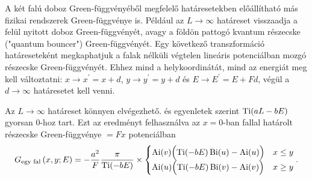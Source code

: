 A két falú doboz Green-függvényéből megfelelő határesetekben előállítható más fizikai rendszerek Green-függvénye is. Például az $L\to\infty$ határeset visszaadja a felül nyitott doboz Green-függvényét, avagy a földön pattogó kvantum részecske ("quantum bouncer") Green-függvényét. Egy következő transzformáció határeseteként megkaphatjuk a falak nélküli végtelen lineáris potenciálban mozgó részecske Green-függvényét. Ehhez mind a helykoordinátát, mind az energiát meg kell változtatni: $x\to x^\prime=x+d$, $y\to y^\prime=y+d$ és $E\to E^\prime=E+Fd$, végül a $d\to\infty$ határesetet kell venni.

Az $L\to\infty$ határeset könnyen elvégezhető.  és  egyenletek szerint $\operatorname{Ti}(aL-bE)$ gyorsan $0$-hoz tart. Ezt az eredményt felhasználva az $x=0$-ban fallal határolt részecske Green-függvénye $=Fx$ potenciálban
\begin{equation}
	G_{\text{egy fal}}\left(x,y;E\right) = -\frac{a^2}{F}\frac{\pi}{\operatorname{Ti}(-bE)}\times
	\begin{cases}
		\operatorname{Ai}(v)\Bigl(\operatorname{Ti}(-bE)\operatorname{Bi}(u)-\operatorname{Ai}(u)\Bigr)& x \leq y\\
		\operatorname{Ai}(u)\Bigl(\operatorname{Ti}(-bE)\operatorname{Bi}(v)-\operatorname{Ai}(v)\Bigr)& x \geq y
	\end{cases}.
	\label{limits:semiinfinite}
\end{equation}

